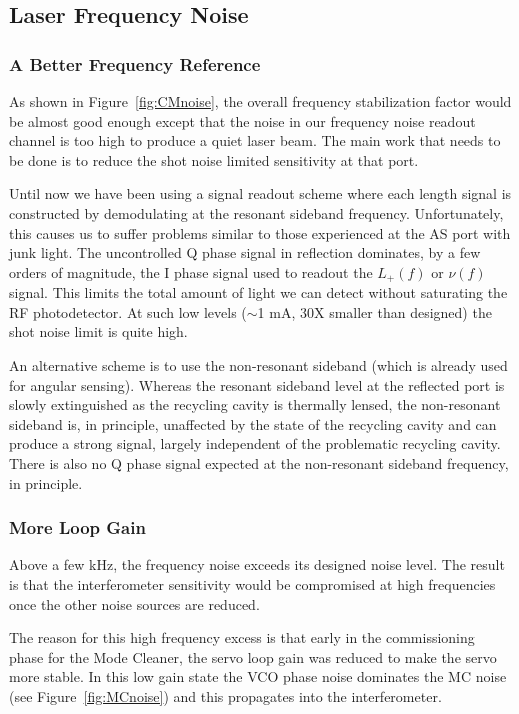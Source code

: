 \subsection{Laser Frequency Noise}

\subsubsection{A Better Frequency Reference}
As shown in Figure~\ref{fig:CMnoise}, the overall frequency stabilization
factor would be almost good enough except that the noise in our frequency
noise readout channel is too high to produce a quiet laser beam. The main
work that needs to be done is to reduce the shot noise limited sensitivity
at that port.

Until now we have been using a signal readout scheme where each length
signal is constructed by demodulating at the resonant sideband frequency.
Unfortunately, this causes us to suffer problems similar to those experienced
at the AS port with junk light. The uncontrolled Q phase signal in reflection
dominates, by a few orders of magnitude, the I phase signal used to readout
the $L_{+}(f)$ or $\nu(f)$ signal. This limits the total amount of light we can
detect without saturating the RF photodetector. At such low levels ($\sim$1 mA,
30X smaller than designed) the shot noise limit is quite high.

An alternative scheme is to use the non-resonant sideband (which is already used
for angular sensing). Whereas the resonant
sideband level at the reflected port is slowly extinguished as the recycling
cavity is thermally lensed, the non-resonant sideband is, in principle, unaffected
by the state of the recycling cavity and can produce a strong signal, largely
independent of the problematic recycling cavity. There is also no Q phase signal 
expected at the non-resonant sideband frequency, in principle.

\subsubsection{More Loop Gain}

Above a few kHz, the frequency noise exceeds its designed noise level. The result
is that the interferometer sensitivity would be compromised at high frequencies
once the other noise sources are reduced.

The reason for this high frequency excess is that early in the commissioning phase
for the Mode Cleaner, the servo loop gain was reduced to make the servo more
stable. In this low gain state the VCO phase noise dominates the MC noise 
(see Figure~\ref{fig:MCnoise}) and this propagates into the interferometer.

